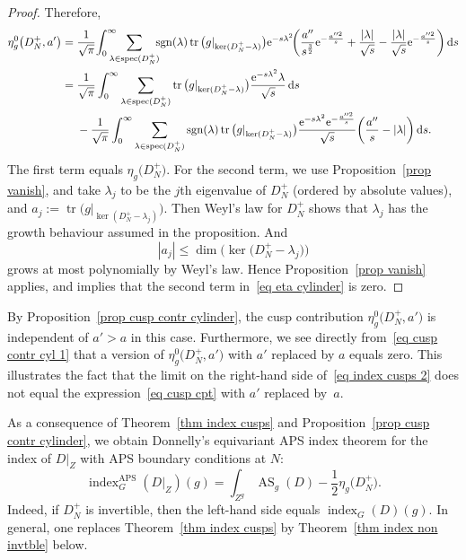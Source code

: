 \documentclass[pdftex]{sigma}%
\numberwithin{equation}{section}
\DeclareMathOperator{\tr}{tr}
\DeclareMathOperator{\spec}{spec}
\DeclareMathOperator{\AS}{AS}
\DeclareMathOperator{\APS}{APS}
\DeclareMathOperator{\ind}{index}
\DeclareMathOperator{\sgn}{sgn}
\begin{document}
\begin{proof}
Therefore,
\begin{align}
\eta^{0}_g\big(D_N^+, a'\big)={}&\frac{1}{\sqrt{\pi}}\! \int_{0}^{\infty}\!\!\!\!\!
\sum_{\lambda \in \spec(D_N^+)}\!\!\! \sgn(\lambda)\tr\big(g|_{\ker(D_N^+ - \lambda)}\big)
{\rm e}^{-s\lambda^2}\!
 \bigg( \frac{a''}{s^{\frac32}}{\rm e}^{-\frac{a''^2}{s}}+\frac{|\lambda|}{\sqrt{ s}}-\frac{|\lambda|}{\sqrt{ s}}{\rm e}^{-\frac{a''^2}{s}} \bigg) \, {\rm d}s\nonumber
 \\
={}& \frac{1}{\sqrt{\pi}}\int_{0}^{\infty}
\sum_{\lambda\in\spec(D_N^+)} \tr\big(g|_{\ker(D_N^+ - \lambda)}\big) \frac{{\rm e}^{-s\lambda^2}\lambda}{\sqrt{s}}\, {\rm d}s \nonumber
\\
& -\frac{1}{\sqrt{\pi}} \int_0^{\infty} \sum_{\lambda\in\spec(D_N^+)}\sgn(\lambda)\tr\big(g|_{\ker(D_N^+ - \lambda)}\big)\frac{{\rm e}^{-s\lambda^2}{\rm e}^{-\frac{a''^2}{s}}}{\sqrt{s}}\bigg(\frac{a''}{s}-|\lambda|\bigg)\, {\rm d}s. \!\!\label{eq eta cylinder}
\end{align}
The first term equals $\eta_g\big(D_N^+\big)$. For the second term, we
use Proposition~\ref{prop vanish},
and take $\lambda_j$ to be the $j$th eigenvalue of $D_N^+$ (ordered by absolute values), and $a_j := \tr\big(g|_{\ker(D_N^+ - \lambda_j)}\big)$.
Then Weyl's law for $D_N^+$ shows that $\lambda_j$ has the growth behaviour assumed in the proposition. And
\[
|a_j| \leq \dim\big(\ker\big(D_N^+ - \lambda_j\big)\big)
\]
grows at most polynomially by Weyl's law.
Hence Proposition~\ref{prop vanish} applies, and implies that the second term in~\eqref{eq eta cylinder} is zero.
\end{proof}

\begin{Remark}\label{rem cyl zero at a}
By Proposition~\ref{prop cusp contr cylinder}, the cusp contribution $\eta^{0}_g\big(D_N^+, a'\big)$ is independent of $a'>a$ in this case. Furthermore, we see directly from~\eqref{eq cusp contr cyl 1} that a version of $\eta^{0}_g\big(D_N^+, a'\big)$ with $a'$ replaced by $a$ equals zero. This illustrates the fact that the limit on the right-hand side of~\eqref{eq index cusps 2} does not equal the expression~\eqref{eq cusp cpt} with $a'$ replaced by~$a$.
\end{Remark}

As a consequence of Theorem~\ref{thm index cusps} and Proposition~\ref{prop cusp contr cylinder}, we obtain Donnelly's equivariant APS index theorem \cite{Donnelly} for the index of $D|_Z$ with APS boundary conditions at $N$:
\[
\ind_G^{\APS}(D|_Z)(g) = \int_{Z^g} \AS_g(D) -\frac{1}{2}\eta_g\big(D_N^+\big).
\]
Indeed, if $D_N^+$ is invertible, then the left-hand side equals $\ind_G(D)(g)$. In general, one replaces Theorem~\ref{thm index cusps} by Theorem~\ref{thm index non invtble} below.
\end{document}
